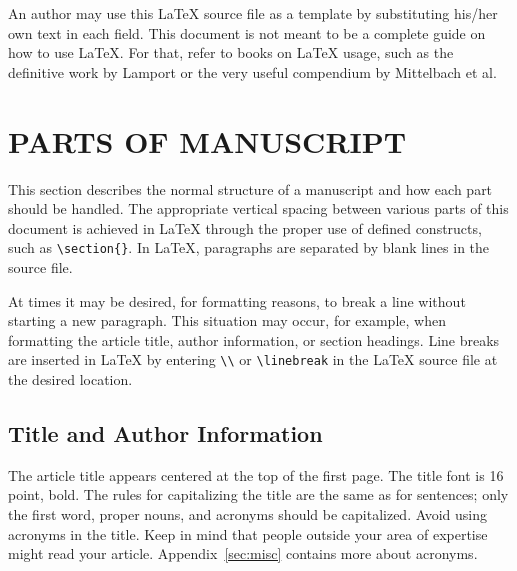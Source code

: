\documentclass[a4paper]{spie}  %
\begin{document}
An author may use this LaTeX source file as a template by substituting his/her own text in each field.  This document is not meant to be a complete guide on how to use LaTeX.  For that, refer to books on LaTeX usage, such as the definitive work by Lamport\cite{Lamport94} or the very useful compendium by Mittelbach et al.\cite{Mittelbach04}

\section{PARTS OF MANUSCRIPT} 

This section describes the normal structure of a manuscript and how each part should be handled.  The appropriate vertical spacing between various parts of this document is achieved in LaTeX through the proper use of defined constructs, such as \verb|\section{}|.  In LaTeX, paragraphs are separated by blank lines in the source file. 

At times it may be desired, for formatting reasons, to break a line without starting a new paragraph.  This situation may occur, for example, when formatting the article title, author information, or section headings.  Line breaks are inserted in LaTeX by entering \verb|\\| or \verb|\linebreak| in the LaTeX source file at the desired location.  


\subsection{Title and Author Information} 
\label{sec:title}

The article title appears centered at the top of the first page.  The title font is 16 point, bold.  The rules for capitalizing the title are the same as for sentences; only the first word, proper nouns, and acronyms should be capitalized.  Avoid using acronyms in the title.  Keep in mind that people outside your area of expertise might read your article.  Appendix~\ref{sec:misc} contains more about acronyms.
\end{document}
